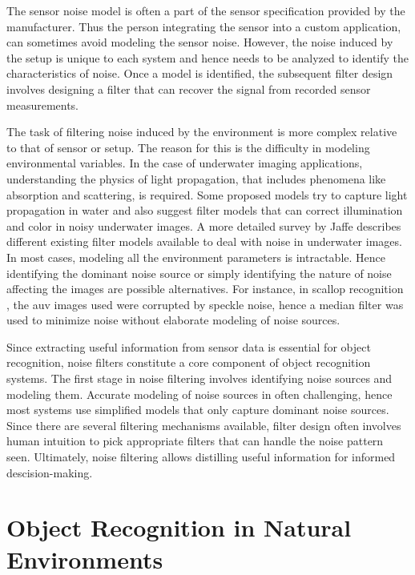 The sensor noise model is often a part of the sensor specification provided by the manufacturer. 
Thus the person integrating the sensor into a custom application, can sometimes avoid modeling the sensor noise. 
However, the noise induced by the setup is unique to each system and hence needs to be analyzed to identify the characteristics of noise.
Once a model is identified, the subsequent filter design involves designing a filter that can recover the signal from recorded sensor measurements.

The task of filtering noise induced by the environment is more complex relative to that
of sensor or setup.
The reason for this is the difficulty in modeling environmental variables. 
In the case of underwater imaging applications, understanding the physics of 
light propagation, that includes phenomena like absorption and scattering, is required. Some proposed models \cite{garcia, ahlen} try to 
capture light propagation in water and also suggest filter models that can correct illumination and color in noisy underwater images. A more detailed survey
by Jaffe \cite{jaffe} describes different existing filter models available to deal with noise in underwater images.
In most cases, modeling all the environment parameters is intractable. Hence identifying the dominant noise source or simply identifying the nature of noise affecting the images are possible alternatives.
For instance, in scallop recognition \cite{prasanna_aslo}, the \gls{auv} images used were corrupted by speckle noise, hence a median filter \cite{despeckle} was used to minimize noise without elaborate modeling of noise sources.

Since extracting useful information from sensor data is essential for object recognition, noise filters constitute a core component of object recognition systems. The first stage in noise filtering involves identifying noise sources and modeling them. Accurate modeling of noise sources in often challenging, hence most systems use simplified models that only capture dominant noise sources. Since there are several filtering mechanisms available, filter design often involves human intuition to pick appropriate filters that can handle the noise pattern seen. Ultimately, noise filtering allows distilling useful information for informed descision-making.

\section{Object Recognition in Natural Environments}

